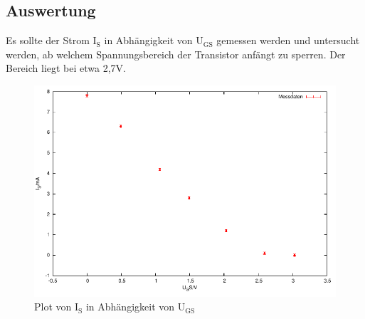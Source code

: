 \documentclass[12pt,a4paper]{article}
\begin{document}
\subsection{Auswertung}

Es sollte der Strom I$_\text{S}$ in Abhängigkeit von U$_\text{GS}$ gemessen werden und untersucht werden, ab welchem Spannungsbereich der Transistor anfängt zu sperren. Der Bereich liegt bei etwa 2,7V. 

\begin{figure}[H] 
  \centering
    \includegraphics[scale = 0.7]{a_4.pdf}
  	\caption[Plot von I$_\text{S}$ in Abhängigkeit von U$_\text{GS}$]{Plot von I$_\text{S}$ in Abhängigkeit von U$_\text{GS}$}
  \label{fig:a_4}
\end{figure}
\end{document}
